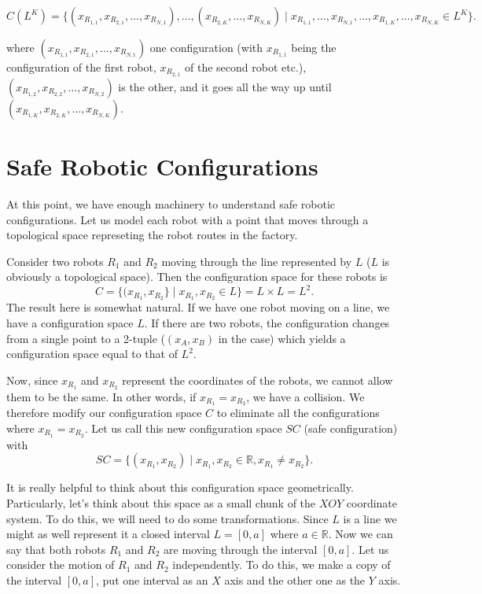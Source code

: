 \documentclass{article}
\newcommand{\reals}{\mathbb{R}}                  %
\theoremstyle{definition}
\begin{document}
$$C(L^K) = \{(x_{R_{1, 1}}, x_{R_{2, 1}}, \dots, x_{R_{N, 1}}), \dots, (x_{R_{2, K}}, \dots, x_{R_{N, K}}) \mid x_{R_{1, 1}}, \dots, x_{R_{N, 1}}, \dots, x_{R_{1, K}}, \dots, x_{R_{N, K}} \in L^K\}.$$

where $(x_{R_{1, 1}}, x_{R_{2, 1}}, \dots, x_{R_{N, 1}})$ one configuration (with $x_{R_{1, 1}}$ being the configuration of the first robot, $x_{R_{2, 1}}$ of the second robot etc.), $(x_{R_{1, 2}}, x_{R_{2, 2}}, \dots, x_{R_{N, 2}})$ is the other, and it goes all
the way up until $(x_{R_{1, K}}, x_{R_{2, K}}, \dots, x_{R_{N, K}})$.


\section*{\centering Safe Robotic Configurations}
At this point, we have enough machinery to understand safe robotic configurations.
Let us model each robot with a point that moves through a topological space represeting
the robot routes in the factory.

\bigskip

Consider two robots $R_1$ and $R_2$ moving through the line represented by $L$ ($L$ is obviously a topological space).
Then the configuration space for these robots is
$$C = \{(x_{R_1}, x_{R_2}\} \mid x_{R_1}, x_{R_2} \in L\} = L \times L = L^2.$$
The result here is somewhat natural. If we have one robot moving on a line, we have a configuration
space $L$. If there are two robots, the configuration changes from a single point to a 2-tuple ($(x_A, x_B)$ in the case)
which yields a configuration space equal to that of $L^2$.

\bigskip

Now, since $x_{R_1}$ and $x_{R_2}$ represent the coordinates of the robots, we cannot allow them to be the same.
In other words, if $x_{R_1} = x_{R_2}$, we have a collision. We therefore modify our configuration space $C$
to eliminate all the configurations where $x_{R_1} = x_{R_2}$. Let us call this new configuration space $SC$
(safe configuration) with
$$SC = \{(x_{R_1}, x_{R_2}) \mid x_{R_1}, x_{R_2} \in \reals, x_{R_1} \neq x_{R_2}\}.$$

\bigskip

It is really helpful to think about this configuration space geometrically.
Particularly, let's think about this space as a small chunk of the $XOY$ coordinate system.
To do this, we will need to do some transformations. Since $L$ is a line we might as well
represent it a closed interval $L = [0, a]$ where $a \in \reals$. Now we can say that both
robots $R_1$ and $R_2$ are moving through the interval $[0, a]$.
Let us consider the motion of $R_1$ and $R_2$ independently. To do this, we make a copy
of the interval $[0, a]$, put one interval as an $X$ axis and the other one as the $Y$ axis.
\end{document}

